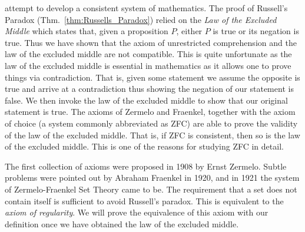     attempt to develop a consistent system of mathematics. The proof of
    Russell's Paradox (Thm.~\ref{thm:Russells_Paradox}) relied on the
    \textit{Law of the Excluded Middle} which
    states that, given a proposition $P$, either $P$ is true or its negation is
    true. Thus we have shown that the axiom of unrestricted
    comprehension and the law of the
    excluded middle are not compatible. This is quite unfortunate as the law of
    the excluded middle is essential in mathematics as it allows one to prove
    things via contradiction. That is, given some
    statement we assume the opposite is true and arrive at a contradiction thus
    showing the negation of our statement is false. We then invoke the law of
    the excluded middle to show that our original statement is true. The axioms
    of Zermelo and Fraenkel, together with the axiom of choice (a system
    commonly abbreviated as ZFC) are able to prove the validity of the law of
    the excluded middle. That is, if ZFC is consistent, then so is the law of
    the excluded middle. This is one of the reasons for studying ZFC in detail.
    \par\hfill\par
    The first collection of axioms were proposed in 1908 by
    Ernst Zermelo. Subtle problems were pointed out by
    Abraham Fraenkel in 1920, and in 1921 the system of
    Zermelo-Fraenkel Set Theory came to be.
    The requirement that a set does not contain itself is sufficient to avoid
    Russell's paradox. This is equivalent to the
    \textit{axiom of regularity}. We will prove the
    equivalence of this axiom with our definition once we have obtained the law
    of the excluded middle.

